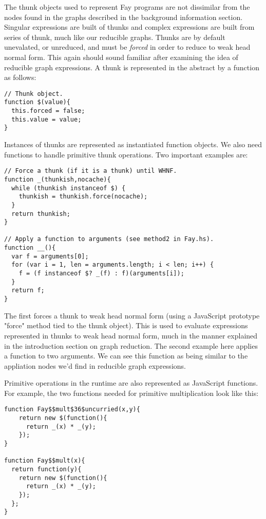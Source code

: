 The thunk objects used to represent Fay programs are not dissimilar from the
nodes found in the graphs described in the background information section.
Singular expressions are built of thunks and complex expressions are built
from series of thunk, much like our reducible graphs. Thunks are by default
unevalated, or unreduced, and must be \emph{forced} in order to reduce to
weak head normal form. This again should sound familiar after examining the
idea of reducible graph expressions. A thunk is represented in the abstract
by a function as follows:

\begin{verbatim}
// Thunk object.
function $(value){
  this.forced = false;
  this.value = value;
}
\end{verbatim}

Instances of thunks are represented as instantiated function objects.
We also need functions to handle primitive thunk operations. Two important
examples are: 

\begin{verbatim}
// Force a thunk (if it is a thunk) until WHNF.
function _(thunkish,nocache){
  while (thunkish instanceof $) {
    thunkish = thunkish.force(nocache);
  }
  return thunkish;
}

// Apply a function to arguments (see method2 in Fay.hs).
function __(){
  var f = arguments[0];
  for (var i = 1, len = arguments.length; i < len; i++) {
    f = (f instanceof $? _(f) : f)(arguments[i]);
  }
  return f;
}
\end{verbatim}

The first forces a thunk to weak head normal form (using a JavaScript
prototype "force" method tied to the thunk object). This is used to 
evaluate expressions represented in thunks to weak head normal form,
much in the manner explained in the introduction section on graph
reduction. The second example here applies a function to two arguments.
We can see this function as being similar to the appliation nodes
we'd find in reducible graph expressions. 

Primitive operations in the runtime are also represented as JavaScript
functions. For example, the two functions needed for primitive
multiplication look like this:

\begin{verbatim}
function Fay$$mult$36$uncurried(x,y){
    return new $(function(){
      return _(x) * _(y);
    });
}

function Fay$$mult(x){
  return function(y){
    return new $(function(){
      return _(x) * _(y);
    });
  };
}
\end{verbatim}

